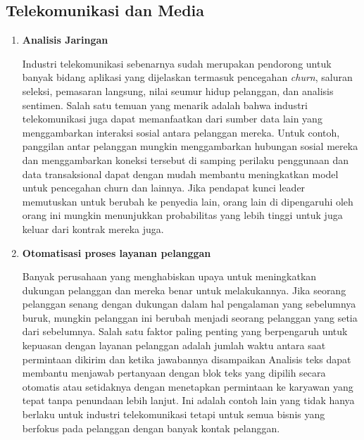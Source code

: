 \subsection{Telekomunikasi dan Media}
\begin{enumerate}
    \item\textbf{ Analisis Jaringan}
    \par Industri telekomunikasi sebenarnya sudah merupakan pendorong untuk banyak bidang aplikasi yang dijelaskan termasuk pencegahan \textit{churn}, saluran seleksi, pemasaran langsung, nilai seumur hidup pelanggan, dan analisis sentimen. Salah satu temuan yang menarik adalah bahwa industri telekomunikasi juga dapat memanfaatkan dari sumber data lain yang menggambarkan interaksi sosial antara pelanggan mereka. Untuk contoh, panggilan antar pelanggan mungkin menggambarkan hubungan sosial mereka dan menggambarkan koneksi tersebut di samping perilaku penggunaan dan data transaksional dapat dengan mudah membantu meningkatkan model untuk pencegahan churn dan lainnya. Jika pendapat kunci leader memutuskan untuk berubah ke penyedia lain, orang lain di dipengaruhi oleh orang ini mungkin menunjukkan probabilitas yang lebih tinggi untuk juga keluar dari kontrak mereka juga.
    
    \item \textbf{	Otomatisasi proses layanan pelanggan}
    
    \par Banyak perusahaan yang menghabiskan upaya untuk meningkatkan dukungan pelanggan dan mereka benar untuk melakukannya. Jika seorang pelanggan senang dengan dukungan dalam hal pengalaman yang sebelumnya buruk, mungkin pelanggan ini berubah menjadi seorang pelanggan yang setia dari sebelumnya. Salah satu faktor paling penting yang berpengaruh untuk kepuasan dengan layanan pelanggan adalah jumlah waktu antara saat permintaan dikirim dan ketika jawabannya disampaikan Analisis teks dapat membantu menjawab pertanyaan dengan blok teks yang dipilih secara otomatis atau setidaknya dengan menetapkan permintaan ke karyawan yang tepat tanpa penundaan lebih lanjut. Ini adalah contoh lain yang tidak hanya berlaku untuk industri telekomunikasi tetapi untuk semua bisnis yang berfokus pada pelanggan dengan banyak kontak pelanggan.
\end{enumerate}

